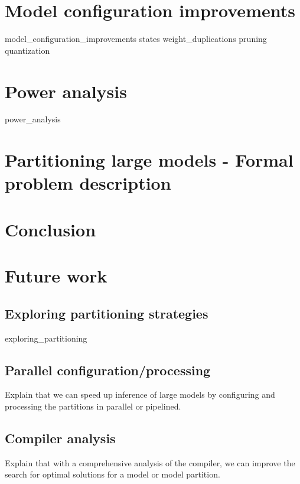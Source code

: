 \documentclass[11pt]{report}
\begin{document}
\chapter{Model configuration improvements}
{model_configuration_improvements}
{states}
{weight_duplications}
{pruning}
{quantization}

\chapter{Power analysis}
{power_analysis}


\chapter{Partitioning large models - Formal problem description}
\label{section:tmp}
\lipsum[1]

\chapter{Conclusion}
\lipsum[1]

\chapter{Future work}
\section{Exploring partitioning strategies}
{exploring_partitioning}
\section{Parallel configuration/processing}
Explain that we can speed up inference of large models by configuring and processing the partitions in parallel or pipelined.

\section{Compiler analysis}
Explain that with a comprehensive analysis of the compiler, we can improve the search for optimal solutions for a model or model partition.
\end{document}
